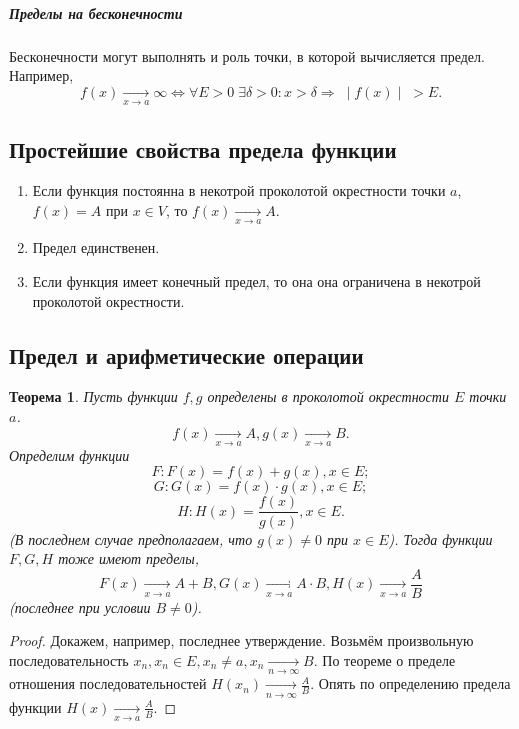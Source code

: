 \documentclass{article}
\newtheorem{Theorem}{Теорема}[section]
\begin{document}
\subparagraph{Пределы на бесконечности}
Бесконечности могут выполнять и роль точки, в которой вычисляется предел. Например,
$$f(x) \xrightarrow[x\rightarrow a]{} \infty \Leftrightarrow \forall E > 0 \; \exists \delta > 0: x > \delta \Rightarrow \; \mid f(x) \mid \; > E.$$

\subsection{Простейшие свойства предела функции}
\begin{enumerate}
\item Если функция постоянна в некотрой проколотой окрестности точки $a$, $f(x) = A$ при $x \in V$, то $f(x) \xrightarrow[x\rightarrow a]{} A.$
\item Предел единственен.
\item Если функция имеет конечный предел, то она она ограничена в некотрой проколотой окрестности.
\end{enumerate}

\subsection{Предел и арифметические операции}
\begin{Theorem}
Пусть функции $f, g$ определены в проколотой окрестности $E$ точки $a$.
$$f(x) \xrightarrow[x\rightarrow a]{} A, g(x) \xrightarrow[x\rightarrow a]{} B.$$
Определим функции
$$F: F(x) = f(x) + g(x), x \in E;$$
$$G: G(x) = f(x) \cdot g(x), x \in E;$$
$$H: H(x) = \frac{f(x)}{g(x)}, x \in E.$$
(В последнем случае предполагаем, что $g(x) \neq 0$ при $x \in E$).
Тогда функции $F, G, H$ тоже имеют пределы,
$$F(x) \xrightarrow[x\rightarrow a]{} A + B, G(x) \xrightarrow[x\rightarrow a]{} A \cdot B, H(x) \xrightarrow[x\rightarrow a]{} \frac{A}{B}$$
(последнее при условии $B \neq 0$).
\end{Theorem}

\begin{proof}
Докажем, например, последнее утверждение.
Возьмём произвольную последовательность ${x_n}, x_n \in E, x_n \neq a, x_n \xrightarrow[n\rightarrow \infty]{} B.$
По теореме о пределе отношения последовательностей $H(x_n) \xrightarrow[n \rightarrow \infty]{} \frac{A}{B}.$ Опять по определению предела функции $H(x) \xrightarrow[x \rightarrow a]{} \frac{A}{B}.$
\end{proof}
\end{document}
